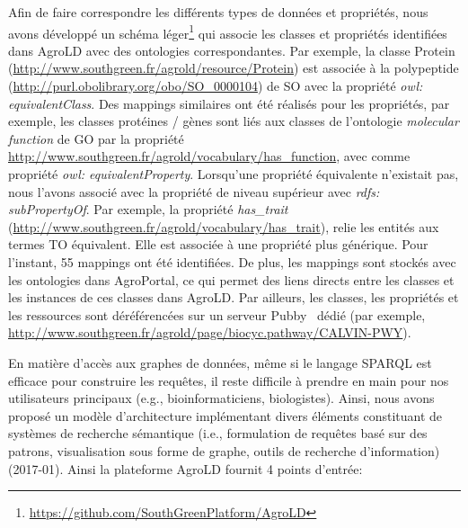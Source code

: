 Afin de faire correspondre les différents types de données et propriétés, nous avons développé un schéma léger\footnote{\url{https://github.com/SouthGreenPlatform/AgroLD}} qui associe les classes et propriétés identifiées dans AgroLD avec des ontologies correspondantes. Par exemple, la classe Protein (\url{http://www.southgreen.fr/agrold/resource/Protein}) est associée à la polypeptide (\url{http://purl.obolibrary.org/obo/SO\_0000104}) de SO avec la propriété \textit{owl: equivalentClass}. Des mappings similaires ont été réalisés pour les propriétés, par exemple, les classes protéines / gènes sont liés aux classes de l'ontologie \textit{molecular function} de GO par la propriété \url{http://www.southgreen.fr/agrold/vocabulary/has\_function}, avec comme propriété \textit{owl: equivalentProperty}. Lorsqu'une propriété équivalente n'existait pas, nous l'avons associé avec la propriété de niveau supérieur avec \textit{rdfs: subPropertyOf}. Par exemple, la propriété \textit{has\_trait} (\url{http://www.southgreen.fr/agrold/vocabulary/has\_trait}), relie les entités aux termes TO équivalent. Elle est associée à une propriété plus générique. Pour l'instant, 55 mappings ont été identifiées. De plus, les mappings sont stockés avec les ontologies dans AgroPortal, ce qui permet des liens directs entre les classes et les instances de ces classes dans AgroLD. Par ailleurs, les classes, les propriétés et les ressources sont déréférencées sur un serveur Pubby~\cite{pubby} dédié (par exemple, \url{http://www.southgreen.fr/agrold/page/biocyc.pathway/CALVIN-PWY}).


En matière d’accès aux graphes de données, même si le langage SPARQL est efficace pour construire les requêtes, il reste difficile à prendre en main pour nos utilisateurs principaux (e.g., bioinformaticiens, biologistes). Ainsi, nous avons proposé un modèle d'architecture implémentant divers éléments constituant de systèmes de recherche sémantique (i.e., formulation de requêtes basé sur des patrons, visualisation sous forme de graphe, outils de recherche d’information) (2017-01).
Ainsi la plateforme AgroLD fournit 4 points d'entrée:\\

